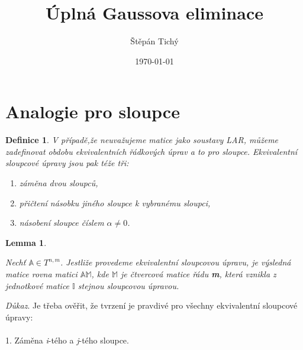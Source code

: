 \documentclass[12pt]{article}
\newtheorem{lemma}[theorem]{Lemma}
\newtheorem{defn}[theorem]{Definice}
\begin{document}
\title{Úplná Gaussova eliminace}
\author{Štěpán Tichý}
\date{\today}

\maketitle

\section{Analogie pro sloupce}
\begin{defn}
\label{defn1}
V případě,že neuvažujeme matice jako soustavy LAR, můžeme zadefinovat obdobu ekvivalentních řádkových úprav a to pro sloupce. Ekvivalentní sloupcové úpravy jsou pak téže tři:
\begin{enumerate}
\item záměna dvou sloupců,
\item přičtení násobku jiného sloupce k vybranému sloupci,
\item násobení sloupce číslem $\alpha \neq 0$.
\end{enumerate}
\end{defn}
\thispagestyle{empty}
\begin{lemma}
\label{lma1}

Nechť $\mathbb{A} \in T^{n,m}$. Jestliže provedeme ekvivalentní sloupcovou úpravu, je výsledná matice rovna matici $\mathbb{AM}$, kde $\mathbb{M}$ je čtvercová matice řádu \textbf{m}, která vznikla z jednotkové matice $\mathbb{I}$ stejnou sloupcovou úpravou.\\
\end{lemma}
\textit{Důkaz}. Je třeba ověřit, že tvrzení je pravdivé pro všechny ekvivalentní sloupcové úpravy:
\\
\\
1. Záměna \textit{i}-tého a \textit{j}-tého sloupce.
\\
\\
\end{document}
